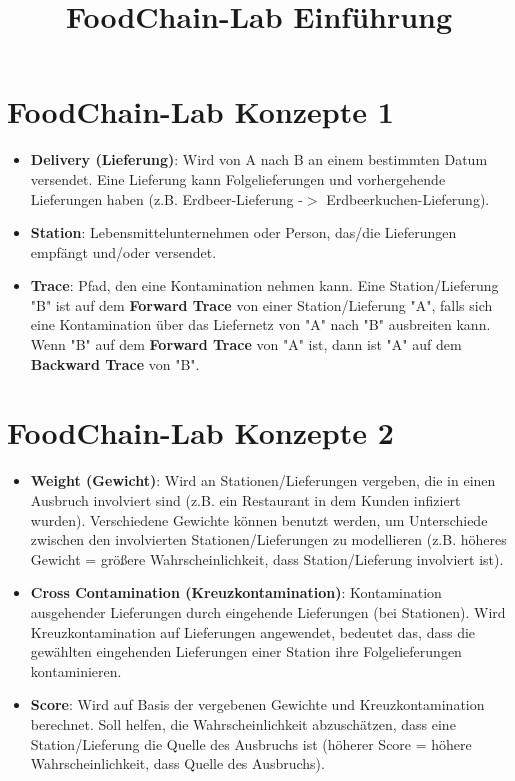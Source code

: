 \documentclass{beamer}
\title{FoodChain-Lab Einführung}
\date{}
\begin{document}
\maketitle

\section{FoodChain-Lab Konzepte 1}
\begin{frame}
	\begin{itemize}
		\item \textbf{Delivery (Lieferung)}: Wird von A nach B an einem bestimmten Datum versendet. Eine Lieferung kann Folgelieferungen und vorhergehende Lieferungen haben (z.B. Erdbeer-Lieferung -$>$ Erdbeerkuchen-Lieferung).
		\item \textbf{Station}: Lebensmittelunternehmen oder Person, das/die Lieferungen empfängt und/oder versendet.
		\item \textbf{Trace}: Pfad, den eine Kontamination nehmen kann. Eine Station/Lieferung "B" ist auf dem \textbf{Forward Trace} von einer Station/Lieferung "A", falls sich eine Kontamination über das Liefernetz von "A" nach "B" ausbreiten kann. Wenn "B" auf dem \textbf{Forward Trace} von "A" ist, dann ist "A" auf dem \textbf{Backward Trace} von "B".
	\end{itemize}
\end{frame}

\section{FoodChain-Lab Konzepte 2}
\begin{frame}
	\begin{itemize}
		\item \textbf{Weight (Gewicht)}: Wird an Stationen/Lieferungen vergeben, die in einen Ausbruch involviert sind (z.B. ein Restaurant in dem Kunden infiziert wurden). Verschiedene Gewichte können benutzt werden, um Unterschiede zwischen den involvierten Stationen/Lieferungen zu modellieren (z.B. höheres Gewicht = größere Wahrscheinlichkeit, dass Station/Lieferung involviert ist).
		\item \textbf{Cross Contamination (Kreuzkontamination)}: Kontamination ausgehender Lieferungen durch eingehende Lieferungen (bei Stationen). Wird Kreuzkontamination auf Lieferungen angewendet, bedeutet das, dass die gewählten eingehenden Lieferungen einer Station ihre Folgelieferungen kontaminieren.
		\item \textbf{Score}: Wird auf Basis der vergebenen Gewichte und Kreuzkontamination berechnet. Soll helfen, die Wahrscheinlichkeit abzuschätzen, dass eine Station/Lieferung die Quelle des Ausbruchs ist (höherer Score = höhere Wahrscheinlichkeit, dass Quelle des Ausbruchs).
	\end{itemize}
\end{frame}
\end{document}
